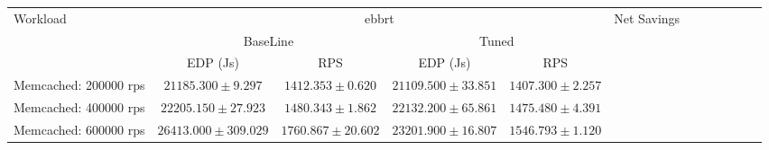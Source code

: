 \begin{table*}[t]
\begin{center}
\begin{tabular}{|l|cc|cc|cc||cc|cc||c|} \hline

\multirow{2}{*}{Workload} & \multicolumn{4}{c|}{ebbrt} & \multirow{2}{*}{Net Savings}\\ 
& \multicolumn{2}{c}{BaseLine} & \multicolumn{2}{c|}{Tuned} &\\
\hline
 & EDP (Js)& RPS & EDP (Js) & RPS & \\  \hline

Memcached: 200000 rps & $21185.300 \pm 9.297$ & $1412.353 \pm 0.620$ & $21109.500 \pm 33.851$ & $1407.300 \pm 2.257$ \\ \hline
Memcached: 400000 rps & $22205.150 \pm 27.923$ & $1480.343 \pm 1.862$ & $22132.200 \pm 65.861$ & $1475.480 \pm 4.391$ \\ \hline
Memcached: 600000 rps & $26413.000 \pm 309.029$ & $1760.867 \pm 20.602$ & $23201.900 \pm 16.807$ & $1546.793 \pm 1.120$ \\ \hline

\hline \hline
\end{tabular}
\end{center}
\end{table*}
